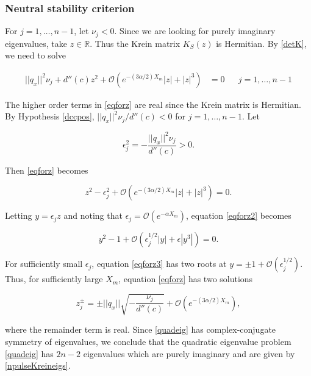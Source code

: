 \documentclass[12pt]{article}
\def\R{{\mathbb R}}
\begin{document}
\subsubsection{Neutral stability criterion}

For $j = 1, \dots, n-1$, let $\nu_j < 0$. Since we are looking for purely imaginary eigenvalues, take $z \in \R$. Thus the Krein matrix $K_S(z)$ is Hermitian. By \eqref{detK}, we need to solve

\begin{align}\label{eqforz}
||q_x||^2 \nu_j + d''(c) z^2 + \mathcal{O}(e^{-(3 \alpha/2) X_m}|z| + |z|^3) &= 0 && j = 1, \dots, n-1
\end{align}

The higher order terms in \eqref{eqforz} are real since the Krein matrix is Hermitian. By Hypothesis \ref{dccpos}, $||q_x||^2 \nu_j / d''(c) < 0$ for $j = 1, \dots, n-1$. Let

\begin{equation}\label{epsilon2}
\epsilon_j^2 = -\frac{||q_x||^2 \nu_j}{d''(c)} > 0.
\end{equation}

Then \eqref{eqforz} becomes

\begin{equation}\label{eqforz2}
z^2 - \epsilon_j^2 + \mathcal{O}(e^{-(3 \alpha/2) X_m}|z| + |z|^3) = 0.
\end{equation}

Letting $y = \epsilon_j z$ and noting that $\epsilon_j = \mathcal{O}(e^{-\alpha X_m})$, equation \eqref{eqforz2} becomes

\begin{equation}\label{eqforz3}
y^2 - 1 + \mathcal{O}(\epsilon_j^{1/2 }|y| + \epsilon|y^3|) = 0.
\end{equation}

For sufficiently small $\epsilon_j$, equation \eqref{eqforz3} has two roots at $y = \pm 1 + \mathcal{O}(\epsilon_j^{1/2})$. Thus, for sufficiently large $X_m$, equation \eqref{eqforz} has two solutions

\begin{equation}
z_j^\pm = \pm ||q_x|| \sqrt{ -\frac{ \nu_j}{d''(c)} } + \mathcal{O}(e^{-(3 \alpha/2) X_m}),
\end{equation}

where the remainder term is real. Since \eqref{quadeig} has complex-conjugate symmetry of eigenvalues, we conclude that the quadratic eigenvalue problem \eqref{quadeig} has $2n - 2$ eigenvalues which are purely imaginary and are given by \eqref{npulseKreineigs}.
\end{document}
